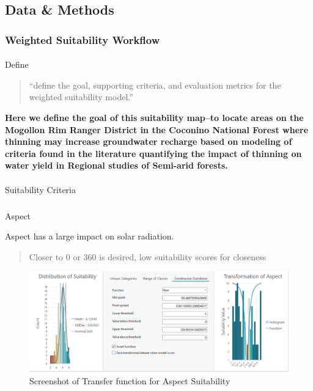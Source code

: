 \documentclass[
]{agujournal2019}
\makeatletter
\let\oldparagraph\paragraph
\renewcommand{\paragraph}{
    \@ifstar
      \xxxParagraphStar
      \xxxParagraphNoStar
  }
\newcommand{\xxxParagraphStar}[1]{\oldparagraph*{#1}\mbox{}}
\newcommand{\xxxParagraphNoStar}[1]{\oldparagraph{#1}\mbox{}}
\let\oldsubparagraph\subparagraph
\renewcommand{\subparagraph}{
    \@ifstar
      \xxxSubParagraphStar
      \xxxSubParagraphNoStar
  }
\newcommand{\xxxSubParagraphStar}[1]{\oldsubparagraph*{#1}\mbox{}}
\newcommand{\xxxSubParagraphNoStar}[1]{\oldsubparagraph{#1}\mbox{}}
\makeatother
\begin{document}
\subsection{Data \& Methods}\label{sec-data-methods}

\subsubsection{Weighted Suitability
Workflow}\label{weighted-suitability-workflow}

\paragraph{Define}\label{define}

\begin{quote}
``define the goal, supporting criteria, and evaluation metrics for the
weighted suitability model.''
\end{quote}

\textbf{Here we define the goal of this suitability map--to locate areas
on the Mogollon Rim Ranger District in the Coconino National Forest
where thinning may increase groundwater recharge based on modeling of
criteria found in the literature quantifying the impact of thinning on
water yield in Regional studies of Semi-arid forests.}

\paragraph{Suitability Criteria}\label{suitability-criteria}

\subparagraph{Aspect}\label{aspect}

Aspect has a large impact on solar radiation.

\begin{quote}
Closer to 0 or 360 is desired, low suitability scores for closeness
\end{quote}

\begin{figure}[H]

{\centering \includegraphics{images/Aspect_suitability.PNG}

}

\caption{Screenshot of Transfer function for Aspect Suitability}

\end{figure}%
\end{document}
